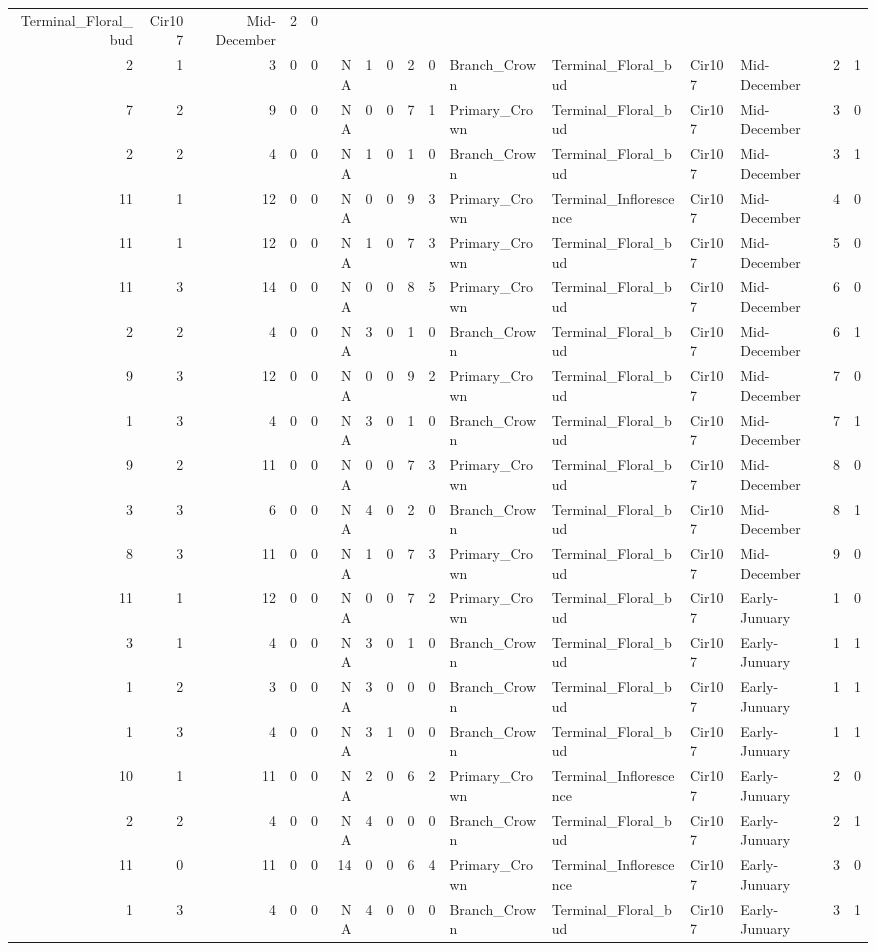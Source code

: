 \documentclass[]{article}
\begin{document}
\begin{longtable}[]{@{}rrrrrrrrrrllllrl@{}}
Terminal\_Floral\_bud & Cir107 & Mid-December & 2 & 0\tabularnewline
2 & 1 & 3 & 0 & 0 & NA & 1 & 0 & 2 & 0 & Branch\_Crown &
Terminal\_Floral\_bud & Cir107 & Mid-December & 2 & 1\tabularnewline
7 & 2 & 9 & 0 & 0 & NA & 0 & 0 & 7 & 1 & Primary\_Crown &
Terminal\_Floral\_bud & Cir107 & Mid-December & 3 & 0\tabularnewline
2 & 2 & 4 & 0 & 0 & NA & 1 & 0 & 1 & 0 & Branch\_Crown &
Terminal\_Floral\_bud & Cir107 & Mid-December & 3 & 1\tabularnewline
11 & 1 & 12 & 0 & 0 & NA & 0 & 0 & 9 & 3 & Primary\_Crown &
Terminal\_Inflorescence & Cir107 & Mid-December & 4 & 0\tabularnewline
11 & 1 & 12 & 0 & 0 & NA & 1 & 0 & 7 & 3 & Primary\_Crown &
Terminal\_Floral\_bud & Cir107 & Mid-December & 5 & 0\tabularnewline
11 & 3 & 14 & 0 & 0 & NA & 0 & 0 & 8 & 5 & Primary\_Crown &
Terminal\_Floral\_bud & Cir107 & Mid-December & 6 & 0\tabularnewline
2 & 2 & 4 & 0 & 0 & NA & 3 & 0 & 1 & 0 & Branch\_Crown &
Terminal\_Floral\_bud & Cir107 & Mid-December & 6 & 1\tabularnewline
9 & 3 & 12 & 0 & 0 & NA & 0 & 0 & 9 & 2 & Primary\_Crown &
Terminal\_Floral\_bud & Cir107 & Mid-December & 7 & 0\tabularnewline
1 & 3 & 4 & 0 & 0 & NA & 3 & 0 & 1 & 0 & Branch\_Crown &
Terminal\_Floral\_bud & Cir107 & Mid-December & 7 & 1\tabularnewline
9 & 2 & 11 & 0 & 0 & NA & 0 & 0 & 7 & 3 & Primary\_Crown &
Terminal\_Floral\_bud & Cir107 & Mid-December & 8 & 0\tabularnewline
3 & 3 & 6 & 0 & 0 & NA & 4 & 0 & 2 & 0 & Branch\_Crown &
Terminal\_Floral\_bud & Cir107 & Mid-December & 8 & 1\tabularnewline
8 & 3 & 11 & 0 & 0 & NA & 1 & 0 & 7 & 3 & Primary\_Crown &
Terminal\_Floral\_bud & Cir107 & Mid-December & 9 & 0\tabularnewline
11 & 1 & 12 & 0 & 0 & NA & 0 & 0 & 7 & 2 & Primary\_Crown &
Terminal\_Floral\_bud & Cir107 & Early-Junuary & 1 & 0\tabularnewline
3 & 1 & 4 & 0 & 0 & NA & 3 & 0 & 1 & 0 & Branch\_Crown &
Terminal\_Floral\_bud & Cir107 & Early-Junuary & 1 & 1\tabularnewline
1 & 2 & 3 & 0 & 0 & NA & 3 & 0 & 0 & 0 & Branch\_Crown &
Terminal\_Floral\_bud & Cir107 & Early-Junuary & 1 & 1\tabularnewline
1 & 3 & 4 & 0 & 0 & NA & 3 & 1 & 0 & 0 & Branch\_Crown &
Terminal\_Floral\_bud & Cir107 & Early-Junuary & 1 & 1\tabularnewline
10 & 1 & 11 & 0 & 0 & NA & 2 & 0 & 6 & 2 & Primary\_Crown &
Terminal\_Inflorescence & Cir107 & Early-Junuary & 2 & 0\tabularnewline
2 & 2 & 4 & 0 & 0 & NA & 4 & 0 & 0 & 0 & Branch\_Crown &
Terminal\_Floral\_bud & Cir107 & Early-Junuary & 2 & 1\tabularnewline
11 & 0 & 11 & 0 & 0 & 14 & 0 & 0 & 6 & 4 & Primary\_Crown &
Terminal\_Inflorescence & Cir107 & Early-Junuary & 3 & 0\tabularnewline
1 & 3 & 4 & 0 & 0 & NA & 4 & 0 & 0 & 0 & Branch\_Crown &
Terminal\_Floral\_bud & Cir107 & Early-Junuary & 3 & 1\tabularnewline

\end{longtable}
\end{document}
